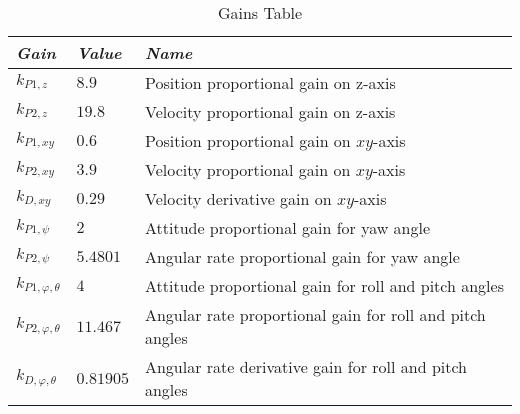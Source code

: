 \begin{table}[h]
    \caption{Gains Table}
    \label{tab:gains}
    \centering
    \begin{tabular}{l|l|l}
\textbf{\textit{Gain}} & \textbf{\textit{Value}}                                                 & \textbf{\textit{Name}}                                      \\ \hline
$k_{P1,z}$            & $8.9$               & Position proportional gain on z-axis     \\
$k_{P2,z}$            & $19.8$              & Velocity proportional gain on z-axis     \\
$k_{P1,xy}$       & $0.6$  & Position proportional gain on $xy$-axis \\
$k_{P2,xy}$       & $3.9$  & Velocity proportional gain on  $xy$-axis \\
$k_{D,xy}$       & $0.29$  & Velocity derivative gain on  $xy$-axis \\
\hline
$k_{P1,\psi}$         & $2$  & Attitude proportional gain for yaw angle     \\
$k_{P2,\psi}$         & $5.4801$ & Angular rate proportional gain for yaw angle \\
$k_{P1,\varphi,\theta}$   & $4$  & Attitude proportional gain for roll and pitch angles     \\
$k_{P2,\varphi,\theta}$   & $11.467$  & Angular rate proportional gain for roll and pitch angles      \\
$k_{D,\varphi,\theta}$   & $0.81905$       & Angular rate derivative gain for roll and pitch angles                        \\
\end{tabular}
\end{table}